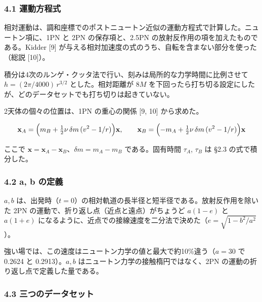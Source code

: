 \documentclass[
  a4paper,
]{ltjsarticle}
\begin{document}
\subsubsection{4.1 運動方程式}\label{ux904bux52d5ux65b9ux7a0bux5f0f}

相対運動は、調和座標でのポストニュートン近似の運動方程式で計算した。ニュートン項に、1PN
と 2PN の保存項と、2.5PN の放射反作用の項を加えたものである。Kidder
{[}9{]} が与える相対加速度の式のうち、自転を含まない部分を使った（総説
{[}10{]}）。

積分は4次のルンゲ・クッタ法で行い、刻みは局所的な力学時間に比例させて
\(h=(2\pi/4000)\,r^{3/2}\) とした。相対距離が \(8M\)
を下回ったら打ち切る設定にしたが、どのデータセットでも打ち切りは起きていない。

2天体の個々の位置は、1PN の重心の関係 {[}9, 10{]} から求めた。

\[
\mathbf x_A=\Bigl(m_B+\tfrac12\nu\,\delta m\,(v^2-1/r)\Bigr)\mathbf x,\qquad
\mathbf x_B=\Bigl(-m_A+\tfrac12\nu\,\delta m\,(v^2-1/r)\Bigr)\mathbf x
\]

ここで \(\mathbf x=\mathbf x_A-\mathbf x_B\)、\(\delta m=m_A-m_B\)
である。固有時間 \(\tau_A\), \(\tau_B\) は §2.3 の式で積分した。

\subsubsection{4.2 a, b の定義}\label{a-b-ux306eux5b9aux7fa9}

\(a, b\)
は、出発時（\(t=0\)）の相対軌道の長半径と短半径である。放射反作用を除いた
2PN の運動で、折り返し点（近点と遠点）がちょうど \(a(1-e)\) と
\(a(1+e)\)
になるように、近点での接線速度を二分法で決めた（\(e=\sqrt{1-b^2/a^2}\)）。

強い場では、この速度はニュートン力学の値と最大で約10\%違う（\(a=30\) で
0.2624 と 0.2913）。\(a, b\) はニュートン力学の接触楕円ではなく、2PN
の運動の折り返し点で定義した量である。

\subsubsection{4.3
三つのデータセット}\label{ux4e09ux3064ux306eux30c7ux30fcux30bfux30bbux30c3ux30c8}
\end{document}
